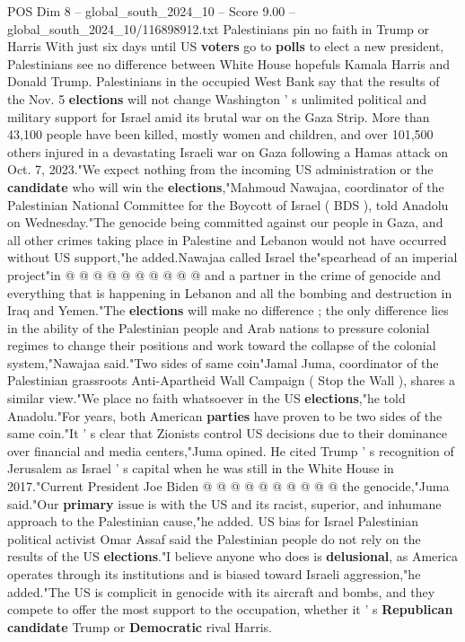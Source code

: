 \begin{textsample}{POS Dim 8 – global\_south\_2024\_10 – Score 9.00 – global\_south\_2024\_10/116898912.txt}  \label{ex:f8_pos_267}
Palestinians pin no faith in Trump or Harris With just six days until US \textbf{voters} go to \textbf{polls} to elect a new president, Palestinians see no difference between White House hopefuls Kamala Harris and Donald Trump.
Palestinians in the occupied West Bank say that the results of the Nov. 5 \textbf{elections} will not change Washington ' s unlimited political and military support for Israel amid its brutal war on the Gaza Strip.
More than 43,100 people have been killed, mostly women and children, and over 101,500 others injured in a devastating Israeli war on Gaza following a Hamas attack on Oct. 7, 2023."We expect nothing from the incoming US administration or the \textbf{candidate} who will win the \textbf{elections},"Mahmoud Nawajaa, coordinator of the Palestinian National Committee for the Boycott of Israel ( BDS ), told Anadolu on Wednesday."The genocide being committed against our people in Gaza, and all other crimes taking place in Palestine and Lebanon would not have occurred without US support,"he added.Nawajaa called Israel the"spearhead of an imperial project"in @ @ @ @ @ @ @ @ @ @ and a partner in the crime of genocide and everything that is happening in Lebanon and all the bombing and destruction in Iraq and Yemen."The \textbf{elections} will make no difference ; the only difference lies in the ability of the Palestinian people and Arab nations to pressure colonial regimes to change their positions and work toward the collapse of the colonial system,"Nawajaa said."Two sides of same coin"Jamal Juma, coordinator of the Palestinian grassroots Anti-Apartheid Wall Campaign ( Stop the Wall ), shares a similar view."We place no faith whatsoever in the US \textbf{elections},"he told Anadolu."For years, both American \textbf{parties} have proven to be two sides of the same coin."It ' s clear that Zionists control US decisions due to their dominance over financial and media centers,"Juma opined.
He cited Trump ' s recognition of Jerusalem as Israel ' s capital when he was still in the White House in 2017."Current President Joe Biden @ @ @ @ @ @ @ @ @ @ the genocide,"Juma said."Our \textbf{primary} issue is with the US and its racist, superior, and inhumane approach to the Palestinian cause,"he added.
US bias for Israel Palestinian political activist Omar Assaf said the Palestinian people do not rely on the results of the US \textbf{elections}."I believe anyone who does is \textbf{delusional}, as America operates through its institutions and is biased toward Israeli aggression,"he added."The US is complicit in genocide with its aircraft and bombs, and they compete to offer the most support to the occupation, whether it ' s \textbf{Republican} \textbf{candidate} Trump or \textbf{Democratic} rival Harris.

\end{textsample}
